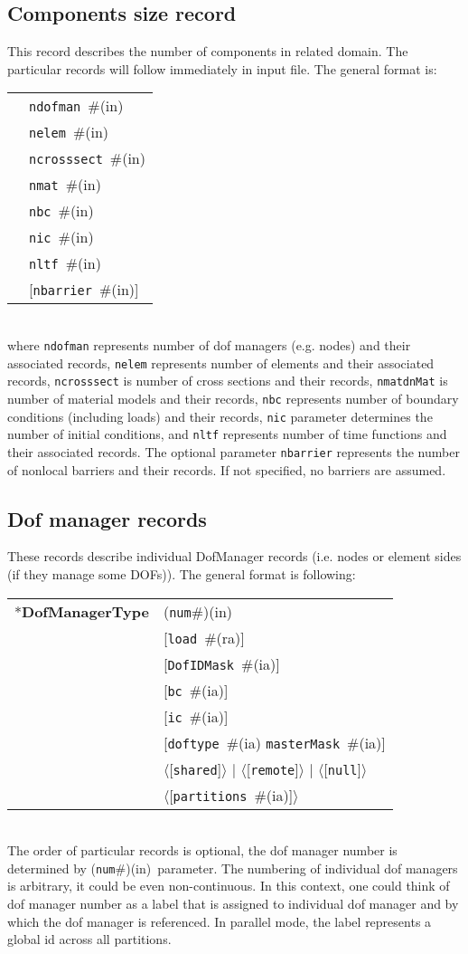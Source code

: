 \documentclass[a4paper]{article}
\newcommand{\param}[1]{\texttt{#1}} %
\newcommand{\optional}[1]{[#1]} %
\newcommand{\field}[2]{\param{#1}~\#{\tiny(#2)}} %
\newcommand{\optField}[2]{\optional{\field{#1}{#2}}}
\newcommand{\optFieldnotype}[1]{[\param{#1}]}
\newcommand{\componentNum}{(\param{num}\#){\tiny(in)}} %
\newcommand{\entKeyword}[1]{*\textbf{#1}} %
\newcommand{\Pmode}[1]{{\sffamily #1}}
\newcommand{\oofemParallel}[1]{$\langle${#1}$\rangle$}
\newcommand{\PoptField}[2]{\oofemParallel{\optField{#1}{#2}}}
\newcommand{\PoptFieldnotype}[1]{\oofemParallel{\optFieldnotype{#1}}}
\newenvironment{record}[1][]{\begin{tabular}{|ll}}{\end{tabular}\\}
\newcommand{\recentry}[2]{{#1}&{#2}\\}
\newcounter{rcc}
\newenvironment{record}[1][\textwidth]{\setcounter{rcc}{0}\rowcolors{1}{lightgray}{lightgray}\tabularx{#1}{llR} \hline}
               {\endtabularx}
\newcommand{\recentry}[2]{\ifthenelse{\value{rcc}>0}{$\backslash$ \\}{\setcounter{rcc}{1}}{#1}&{#2}&}
\begin{document}
\subsection{Components size record}
\label{_ComponentsSizeRecord}
This record describes the number of components in related domain. The
particular records will follow immediately in input file. The general format is:\\
\begin{record}
  \recentry{}{\field{ndofman}{in}}
  \recentry{}{\field{nelem}{in}}
  \recentry{}{\field{ncrosssect}{in}}
  \recentry{}{\field{nmat}{in}}
  \recentry{}{\field{nbc}{in}}
  \recentry{}{\field{nic}{in}}
  \recentry{}{\field{nltf}{in}}
  \recentry{}{\optField{nbarrier}{in}}
\end{record}
where \param{ndofman} represents number of dof managers (e.g. nodes) and their associated records,
\param{nelem} represents number of elements and their associated records, \param{ncrosssect} is
number of cross sections and their records, \param{nmatdnMat}{} is number of material
models and their records, \param{nbc}{} represents number of boundary
conditions (including loads) and their
records, \param{nic} parameter determines the number of initial
conditions, and \param{nltf} represents number of time functions and
their associated records. The optional parameter \param{nbarrier}
represents the number of nonlocal barriers and their records. If not
specified, no barriers are assumed.

\subsection{Dof manager records}
\label{_NodeElementSideRecords}
These records describe individual DofManager records (i.e. nodes or element sides (if they manage some DOFs)). The general format is following:

\noindent
\begin{record}
  \recentry{\entKeyword{DofManagerType}}{\componentNum}
  \recentry{}{[\field{load}{ra}]}
  \recentry{}{[\field{DofIDMask}{ia}]}
  \recentry{}{\optField{bc}{ia}}
  \recentry{}{\optField{ic}{ia}}
  \recentry{}{[\field{doftype}{ia} \field{masterMask}{ia}]}
  \recentry{}{\PoptFieldnotype{shared} $|$ \PoptFieldnotype{remote} $|$ \PoptFieldnotype{null}}
  \recentry{}{\PoptField{partitions}{ia}}
\end{record}
The order of particular records is optional, the dof manager number is determined by \componentNum\ parameter.
The numbering of individual dof managers is arbitrary, it could be even non-continuous. In this context, one could think of dof manager number as a label that is assigned to individual dof manager and by which the dof manager is referenced.
\Pmode{In parallel mode, the label represents a global id across all partitions.}
\end{document}
